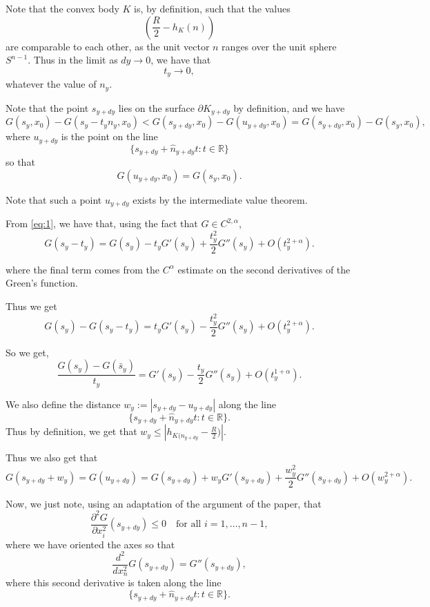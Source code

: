 \documentclass{article}
\theoremstyle{plain}
\theoremstyle{definition}
\theoremstyle{plain}
\begin{document}
Note that the convex body $K$ is, by definition, such that the values
\[
\left( \frac{R}{2} - h_K( n) \right)
\]
are comparable to each other, as the unit vector $ n$ ranges over the unit sphere $S^{n-1}$. Thus in the limit as $dy \to 0$, we have that
\[
t_y \to 0,
\]
whatever the value of $n_y$.

Note that the point $ s_{y+dy}$ lies on the surface $\partial K_{y+dy}$ by definition, and we have
\begin{equation}\label{eq200}
G(s_y, x_0) - G(s_y - t_y n_y, x_0)
< G(s_{y+dy}, x_0) - G(u_{y+dy}, x_0)
= G(s_{y+dy}, x_0) - G(s_y, x_0),
\end{equation}
where $u_{y+dy}$ is the point on the line
\[
\{ s_{y+dy} + \hat n_{y+dy} t : t \in \mathbb{R} \}
\]
so that
\[
G(u_{y+dy}, x_0) = G(s_y, x_0).
\]

Note that such a point $u_{y+dy}$ exists by the intermediate value theorem.

From \eqref{eq:1}, we have that, using the fact that $G \in C^{2,\alpha}$,
\begin{equation}
G(s_y - t_y) 
= G(s_y) - t_y G'(s_y) + \frac{t_y^2}{2} G''(s_y)
+ O(t_y^{2+\alpha}).
\label{eq:2}
\end{equation}

where the final term comes from the $C^\alpha$ estimate on the second derivatives of the Green's function. 

Thus we get
\begin{equation}
G(s_y) - G(s_y - t_y)
= t_y G'(s_y) - \frac{t_y^2}{2} G''(s_y)
+ O(t_y^{2+\alpha}).
\label{eq:3}
\end{equation}

So we get,
\begin{equation}
\frac{G(s_y) - G(\bar{s}_{y})}{t_y}
= G'(s_y) - \frac{t_y}{2} G''(s_y) + O(t_y^{1+\alpha}).
\label{eq:4}
\end{equation}

We also define the distance $w_y := |s_{y+dy} - u_{y+dy}|$ along the line
\[
\{ s_{y+dy} + \hat n_{y+dy} t : t \in \mathbb{R} \}.
\]
Thus by definition, we get that $w_y \leq |h_{K(n_{y+dy}}-\frac{R}{2})|$.

Thus we also get that
\begin{equation}
G(s_{y+dy} + w_y)
= G(u_{y+dy})
= G(s_{y+dy}) + w_y G'(s_{y+dy})
+ \frac{w_y^2}{2} G''(s_{y+dy})
+ O(w_y^{2+\alpha}).
\label{eq:5}
\end{equation}

Now, we just note, using an adaptation of the argument of the \cite{Pat25} paper, that
\[
\frac{\partial^2 G}{\partial x_i^2}(s_{y+dy}) \le 0
\quad \text{for all } i=1,\dots,n-1,
\]
where we have oriented the axes so that
\[
\frac{d^2}{dx_n^2} G(s_{y+dy}) = G''(s_{y+dy}),
\]
where this second derivative is taken along the line
\[
\{ s_{y+dy} + \hat n_{y+dy} t : t \in \mathbb{R} \}.
\]
\end{document}
